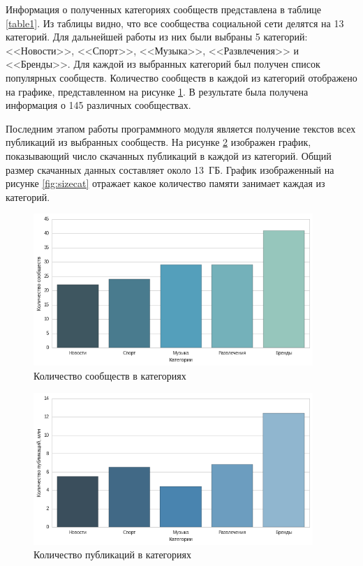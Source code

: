 \documentclass[a4paper]{report}
\begin{document}
	
	
	
	Информация о полученных категориях сообществ представлена в таблице \ref{table1}. Из таблицы видно, что все сообщества социальной сети делятся на 13 категорий. Для дальнейшей работы из них были выбраны 5 категорий: <<Новости>>, <<Спорт>>, <<Музыка>>, <<Развлечения>> и <<Бренды>>. Для каждой из выбранных категорий был получен список популярных сообществ. Количество сообществ в каждой из категорий отображено на графике, представленном на рисунке \ref{fig:groupincat}. В результате была получена информация о 145 различных сообществах. 
	
	Последним этапом работы программного модуля является получение текстов всех публикаций из выбранных сообществ. На рисунке \ref{fig:numart} изображен график, показывающий число скачанных публикаций в каждой из категорий. 
	Общий размер скачанных данных составляет около 13~ГБ. График изображенный на рисунке \ref{fig:sizecat} отражает какое количество памяти занимает каждая из категорий. 
	
	
	
	\begin{figure}[t]
		\centering
		\includegraphics[width=400px]
		{imgs/GroupInCat.png}
		\caption{Количество сообществ в категориях}
		\label{fig:groupincat}
	\end{figure} 
	
	
	\begin{figure}
		\centering
		\includegraphics[width=400px]
		{imgs/NumArticles.png}
		\caption{Количество публикаций в категориях}
		\label{fig:numart}
	\end{figure} 
	
\end{document}
